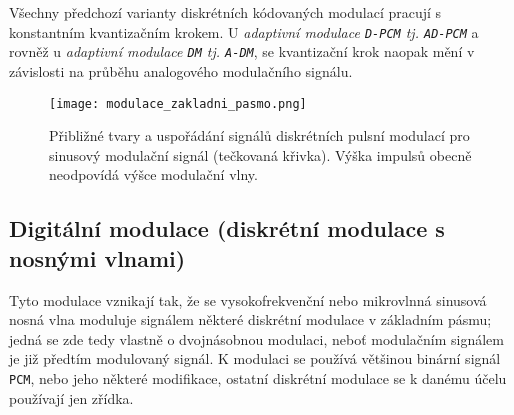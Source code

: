       Všechny předchozí varianty diskrétních kódovaných modulací pracují s konstantním kvantizačním 
      krokem. U \emph{adaptivní modulace \texttt{D-PCM} tj. \texttt{AD-PCM}} a rovněž u 
      \emph{adaptivní modulace \texttt{DM} tj. \texttt{A-DM}}, se kvantizační krok naopak mění v 
      závislosti na průběhu analogového modulačního signálu.
    
    \begin{figure}[ht!]  %
      \centering
      \texttt{[image: modulace\_zakladni\_pasmo.png]}
      \caption{Přibližné tvary a uspořádání signálů diskrétních pulsní modulací pro sinusový   
               modulační signál (tečkovaná křivka). Výška impulsů obecně neodpovídá výšce modulační 
               vlny.}
      \label{fig_RA:modulace04}
    \end{figure}
    
    \subsection{Digitální modulace (diskrétní modulace s nosnými vlnami)}
      Tyto modulace vznikají tak, že se vysokofrekvenční nebo mikrovlnná sinusová nosná vlna 
      moduluje signálem některé diskrétní modulace v základním pásmu; jedná se zde tedy vlastně o 
      dvojnásobnou modulaci, neboť modulačním signálem je již předtím modulovaný signál. K modulaci 
      se používá většinou binární signál \texttt{PCM}, nebo jeho některé modifikace, ostatní 
      diskrétní modulace se k danému účelu používají jen zřídka.
      
